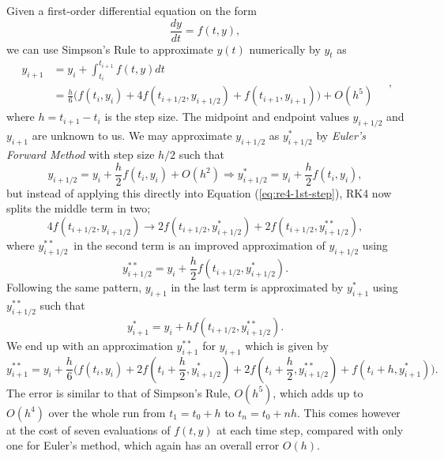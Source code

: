 \documentclass[]{article}
\begin{document}
Given a first-order differential equation on the form
\begin{equation}
	\frac{dy}{dt} = f(t, y),
\end{equation}
we can use Simpson's Rule to approximate $y(t)$ numerically by $y_t$ as
\begin{equation}
\begin{aligned} \label{eq:re4-1st-step}
		y_{i+1} &= y_i + \int_{t_i}^{t_{i+1}} f(t,y) dt \\
		&= \frac{h}{6} \big( f(t_i, y_i) + 4f(t_{i+1/2}, y_{i+1/2}) + f(t_{i+1}, y_{i+1}) \big) + O(h^5)
\end{aligned} \quad ,
\end{equation}
where $h=t_{i+1} - t_i$ is the step size. The midpoint and endpoint values $y_{i+1/2}$ and $y_{i+1}$ are unknown to us. We may approximate $y_{i+1/2}$ as $y^*_{i+1/2}$ by \textit{Euler's Forward Method} with step size $h/2$ such that
\begin{equation}
	y_{i+1/2} = y_i + \frac{h}{2} f(t_i, y_i) + O(h^2) \Rightarrow y^*_{i+1/2} = y_i + \frac{h}{2} f(t_i, y_i),
\end{equation}
but instead of applying this directly into Equation (\ref{eq:re4-1st-step}), RK4 now splits the middle term in two;
\begin{equation}
	4f(t_{i+1/2}, y_{i+1/2}) \rightarrow 2f(t_{i+1/2}, y^{*}_{i+1/2}) + 2f(t_{i+1/2}, y^{**}_{i+1/2}),
\end{equation}
where $y^{**}_{i+1/2}$ in the second term is an improved approximation of $y_{i+1/2}$ using
\begin{equation}
	y^{**}_{i+1/2} = y_i + \frac{h}{2} f(t_{i+1/2}, y^{*}_{i+1/2}).
\end{equation}
Following the same pattern, $y_{i+1}$ in the last term is approximated by $y^*_{i+1}$ using $y^{**}_{i+1/2}$ such that
\begin{equation}
	y^{*}_{i+1} = y_i + h f(t_{i+1/2}, y^{**}_{i+1/2}).
\end{equation}
We end up with an approximation $y^{**}_{i+1}$ for $y_{i+1}$ which is given by
\begin{equation}
	y^{**}_{i+1} = y_i + \frac{h}{6} \big( f(t_i, y_i) + 2f(t_i + \frac{h}{2}, y^*_{i+1/2}) + 2f(t_i + \frac{h}{2}, y^{**}_{i+1/2}) + f(t_i+h, y^*_{i+1}) \big).
\end{equation}
The error is similar to that of Simpson's Rule, $O(h^5)$, which adds up to $O(h^4)$ over the whole run from $t_1=t_0+h$ to $t_n=t_0+nh$. This comes however at the cost of seven evaluations of $f(t,y)$ at each time step, compared with only one for Euler's method, which again has an overall error $O(h)$.
\end{document}
